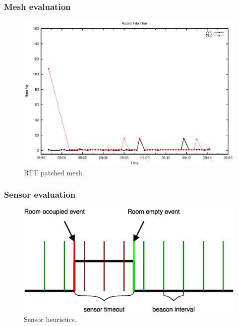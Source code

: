 \documentclass{beamer}
\begin{document}
\begin{frame}
\frametitle{Mesh evaluation}
	
	\begin{center}
		\begin{figure}
			\includegraphics[width=\textwidth]{plot_patched.eps}
			\caption{RTT patched mesh.}
		\end{figure}
	\end{center}
	
\end{frame}

\begin{frame}
\frametitle{Sensor evaluation}

	\begin{center}
		\begin{figure}
			\includegraphics[width=\textwidth]{sensor.eps}
			\caption{Sensor heuristics.}
		\end{figure}
	\end{center}

\end{frame}
\end{document}
